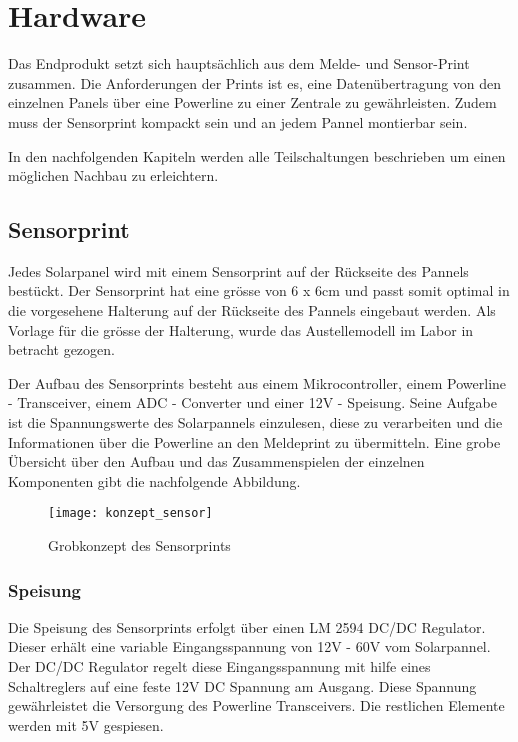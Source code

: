 \section{Hardware}
Das Endprodukt setzt sich hauptsächlich aus dem Melde- und Sensor-Print zusammen. Die Anforderungen der Prints ist es, eine Datenübertragung von den einzelnen Panels      über eine Powerline zu einer Zentrale zu gewährleisten. Zudem muss der Sensorprint kompackt sein und an jedem Pannel montierbar sein.

In den nachfolgenden Kapiteln werden alle Teilschaltungen beschrieben um einen möglichen Nachbau zu erleichtern.

\subsection{Sensorprint}


Jedes Solarpanel wird mit einem Sensorprint auf der Rückseite des Pannels bestückt. Der Sensorprint hat eine grösse von 6 x 6cm und passt somit optimal in die vorgesehene Halterung auf der Rückseite des Pannels eingebaut werden. Als Vorlage für die grösse der Halterung, wurde das Austellemodell im Labor in betracht gezogen.

Der Aufbau des Sensorprints besteht aus einem Mikrocontroller, einem Powerline - Transceiver, einem ADC - Converter und einer 12V - Speisung. Seine Aufgabe ist die Spannungswerte des Solarpannels einzulesen, diese zu verarbeiten und die Informationen über die Powerline an den Meldeprint zu übermitteln. Eine grobe Übersicht über den Aufbau und das Zusammenspielen der einzelnen Komponenten gibt die nachfolgende Abbildung.

\begin{figure}[h]
\centering
\texttt{[image: konzept\_sensor]}
\caption{Grobkonzept des Sensorprints}
\end{figure}

\subsubsection{Speisung}
Die Speisung des Sensorprints erfolgt über einen LM 2594 DC/DC Regulator. Dieser erhält eine variable Eingangsspannung von 12V - 60V vom Solarpannel. Der DC/DC Regulator regelt diese Eingangsspannung mit hilfe eines Schaltreglers auf eine feste 12V DC Spannung am Ausgang. Diese Spannung gewährleistet die Versorgung des Powerline Transceivers. Die restlichen Elemente werden mit 5V gespiesen.

